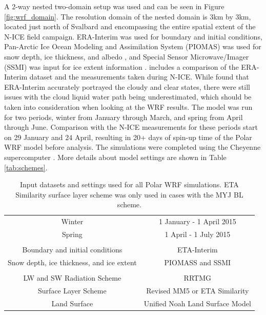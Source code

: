 A 2-way nested two-domain setup was used and can be seen in Figure \ref{fig:wrf_domain}. The resolution domain of the nested domain is 3km by 3km, located just north of Svalbard and encompassing the entire spatial extent of the N-ICE field campaign. ERA-Interim was used for boundary and initial conditions, Pan-Arctic Ice Ocean Modeling and Assimilation System (PIOMAS) was used for snow depth, ice thickness, and albedo  \citep{PIOMASS}, and Special Sensor Microwave/Imager (SSMI) was input for ice extent information \cite{SSMI, schweiger:2011}. \citet{graham:2017} includes a comparison of the ERA-Interim dataset and the measurements taken during N-ICE. While \cite{graham:2017} found that ERA-Interim accurately portrayed the cloudy and clear states, there were still issues with the cloud liquid water path being underestimated, which should be taken into consideration when looking at the WRF results. The model was run for two periods, winter from January through March, and spring from April through June. Comparison with the N-ICE measurements for these periods start on 29 January and 24 April, resulting in 20+ days of spin-up time of the Polar WRF model before analysis. The simulations were completed using the Cheyenne supercomputer \citep{cheyenne}. More details about model settings are shown in Table \ref{tab:schemes}. 

\begin{table}[H]
\centering
\footnotesize
{
\begin{tabular}{| c | c |}
\hline
\rowcolor[HTML]{F3F3F3} \multicolumn{2}{|c|}{\textbf{Dates}} \\
\hline
Winter & 1 January - 1 April 2015 \\
Spring & 1 April - 1 July 2015 \\
\hline
 \rowcolor[HTML]{F3F3F3} \multicolumn{2}{|c|}{\textbf{Input Datasets}} \\
\hline
 Boundary and initial conditions & ETA-Interim \\
 Snow depth, ice thickness, and ice extent & PIOMASS and SSMI \\
\hline
\rowcolor[HTML]{F3F3F3} \multicolumn{2}{|c|}{\textbf{Polar WRF Settings}} \\
\hline
 LW and SW Radiation Scheme & RRTMG \\ 
 Surface Layer Scheme & Revised MM5 or ETA Similarity \\
 Land Surface & Unified Noah Land Surface Model \\ 
  \hline
\end{tabular}}
\caption{Input datasets and settings used for all Polar WRF simulations. ETA Similarity surface layer scheme was only used in cases with the MYJ BL scheme.}
\label{tab:setup}
\end{table}

